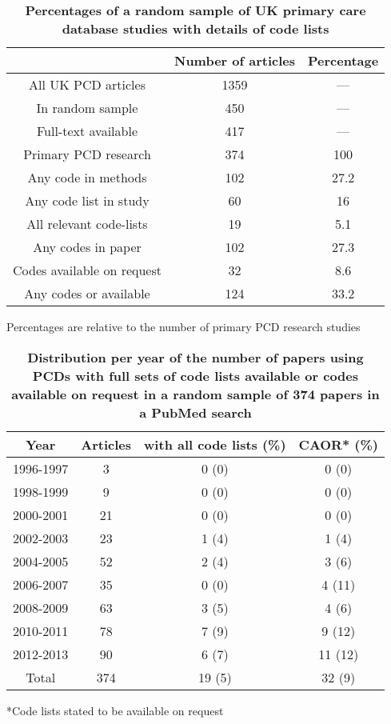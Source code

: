 \documentclass[10pt]{article}
\begin{document}
\begin{table}[!ht]
  \caption{
    \bf{Percentages of a random sample of UK primary care database studies with details of code lists}}
  \begin{tabular}{|c|c|c|}
    \hline
                 & Number of articles & Percentage \\
    \hline
    All UK PCD articles        & 1359 & ---  \\
    In random sample           & 450  & ---  \\
    Full-text available        & 417  & ---  \\
    Primary PCD research       & 374  & 100  \\
    Any code in methods        & 102  & 27.2 \\
    Any code list in study     & 60   & 16   \\
    All relevant code-lists    & 19   & 5.1  \\
    Any codes in paper         & 102  & 27.3 \\
    Codes available on request & 32   & 8.6  \\
    Any codes or available     & 124  & 33.2 \\
    \hline
  \end{tabular}
  \begin{flushleft}Percentages are relative to the number of primary PCD research studies 
  \end{flushleft}
  \label{tab:table1_percentages}
\end{table}

\begin{table}[!ht]
  \caption{
    \bf{Distribution per year of the number of papers using PCDs with full sets of code lists available or codes available on request in a random sample of 374 papers in a PubMed search}}
  \begin{tabular}{|c|c|c|c|}
    \hline
    Year             & Articles &  with all code lists (\%) & CAOR* (\%) \\
    \hline
    1996-1997   & 3   & 0 (0)  & 0 (0)  \\
    1998-1999   & 9   & 0 (0)  & 0 (0)  \\
    2000-2001   & 21  & 0 (0)  & 0 (0)  \\
    2002-2003   & 23  & 1 (4)  & 1 (4)  \\
    2004-2005   & 52  & 2 (4)  & 3 (6)  \\
    2006-2007   & 35  & 0 (0)  & 4 (11) \\
    2008-2009   & 63  & 3 (5)  & 4 (6)  \\
    2010-2011   & 78  & 7 (9)  & 9 (12) \\
    2012-2013   & 90  & 6 (7)  & 11 (12)\\
    Total       & 374 & 19 (5) & 32 (9) \\
    \hline
  \end{tabular}
  \begin{flushleft}*Code lists stated to be available on request 
  \end{flushleft}
  \label{tab:table2_years}
\end{table}
\end{document}
